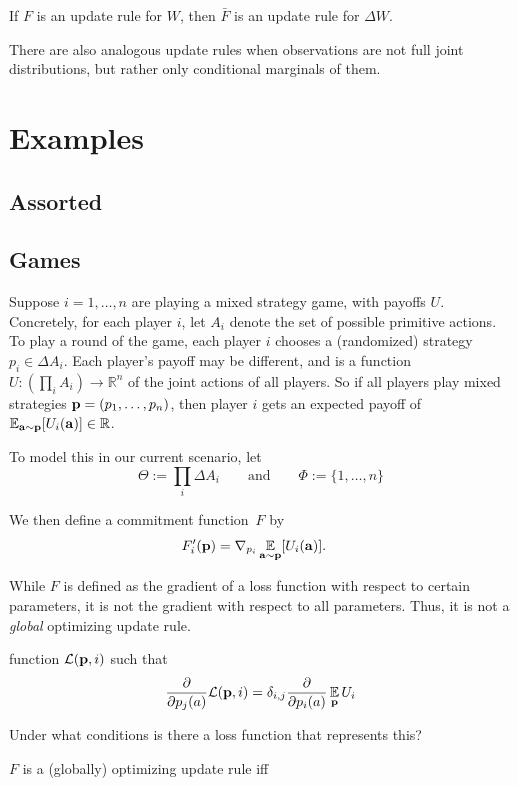 \documentclass{article}
\def\cofunc{commitment function}
\begin{document}
If $F$ is an update rule for $W$, then $\bar F$ is an update rule for $\Delta W$. 

There are also analogous update rules when observations are not full joint distributions, but rather only conditional marginals of them.



\section{Examples}
\subsection{Assorted}

\subsection{Games}
Suppose $i = 1, \ldots, n$ are playing a mixed strategy game, with payoffs $U$. 
Concretely, for each player $i$, let $A_i$ denote the set of possible primitive actions.
To play a round of the game, each player $i$ chooses a (randomized) strategy $p_i \in \Delta A_i$.
Each player's payoff may be different, and is a function $U: (\prod_{i}A_i) \to \mathbb R^n$ of the joint actions of all players. 
So if all players play mixed strategies $\mathbf{p} = (p_1, \ldots, p_n)$, then
player $i$ gets an expected payoff of $\operatorname*{\mathbb{E}}_{\mathbf{a} \sim \mathbf{p}}[U_i(\mathbf{a})] \in \mathbb R$.


To model this in our current scenario, let
\[
    \Theta := \prod_{i} \Delta A_i 
        \qquad\text{and}\qquad
    \Phi := \{ 1, \ldots, n \}
\]


We then define a \cofunc\ $F$ by 
\begin{align*}
    F'_{i}(\mathbf{p}) &= \nabla_{p_i}\operatorname*{\mathbb{E}}_{\mathbf{a} \sim \mathbf{p}}[U_i(\mathbf{a})].
\end{align*}


\begin{remark}
    While $F$ is defined as the gradient of a loss function with respect to certain parameters, it is not the gradient with respect to all parameters. 
    Thus, it is not a \emph{global} optimizing update rule.

    function $\mathcal L(\mathbf{p}, i)$ such that
    \[
        \frac{\partial}{\partial p_j(a)} \mathcal L(\mathbf{p}, i) = 
            \delta_{i,j} \frac\partial{\partial p_i(a)} \operatorname*{\mathbb{E}}_{\mathbf{p}} U_i
    \]
\end{remark}
\begin{openQ}
    Under what conditions is there a loss function that represents this?
\end{openQ}
\begin{conj}
    $F$ is a (globally) optimizing update rule iff  
\end{conj}
\end{document}
